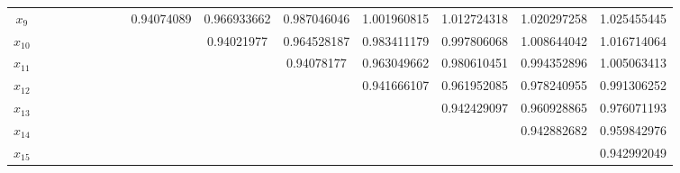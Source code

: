 \documentclass[a4paper]{article}
\begin{document}
\begin{CJK*}{GBK}{song}
\begin{center}
\begin{table*}[!htbp]
{\begin{threeparttable}[!htbp]
\begin{tabular}{ccccc ccccc ccccc}
$x_{9}$	&		&		&		&		&		&		&		&	0.94074089	&	0.966933662	&	0.987046046	&	1.001960815	&	1.012724318	&	1.020297258	&	1.025455445	\\
$x_{10}$	&		&		&		&		&		&		&		&		&	0.94021977	&	0.964528187	&	0.983411179	&	0.997806068	&	1.008644042	&	1.016714064	\\
$x_{11}$	&		&		&		&		&		&		&		&		&		&	0.94078177	&	0.963049662	&	0.980610451	&	0.994352896	&	1.005063413	\\
$x_{12}$	&		&		&		&		&		&		&		&		&		&		&	0.941666107	&	0.961952085	&	0.978240955	&	0.991306252	\\
$x_{13}$	&		&		&		&		&		&		&		&		&		&		&		&	0.942429097	&	0.960928865	&	0.976071193	\\
$x_{14}$	&		&		&		&		&		&		&		&		&		&		&		&		&	0.942882682	&	0.959842976	\\
$x_{15}$	&		&		&		&		&		&		&		&		&		&		&		&		&		&	0.942992049	\\

 \bottomrule
\end{tabular}
\end{threeparttable}}%
\end{table*}
\end{center}


\end{CJK*}
\end{document}
